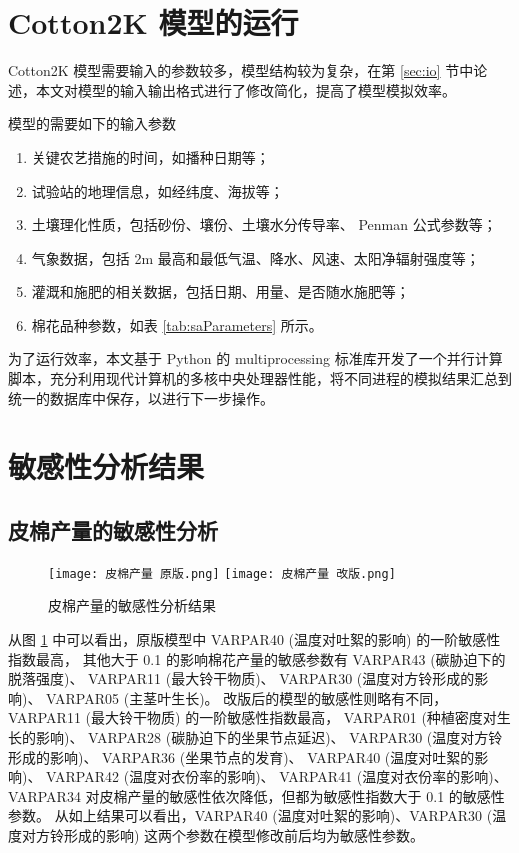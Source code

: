 \begin{spacing}{}
    \section{Cotton2K 模型的运行}
    Cotton2K 模型需要输入的参数较多，模型结构较为复杂，在第 \ref{sec:io} 节中论述，本文对模型的输入输出格式进行了修改简化，提高了模型模拟效率。

    模型的需要如下的输入参数
    \begin{enumerate}
        \item 关键农艺措施的时间，如播种日期等；
        \item 试验站的地理信息，如经纬度、海拔等；
        \item 土壤理化性质，包括砂份、壤份、土壤水分传导率、 Penman 公式参数等；
        \item 气象数据，包括 2m 最高和最低气温、降水、风速、太阳净辐射强度等；
        \item 灌溉和施肥的相关数据，包括日期、用量、是否随水施肥等；
        \item 棉花品种参数，如表 \ref{tab:saParameters} 所示。
    \end{enumerate}

    为了运行效率，本文基于 Python 的 multiprocessing 标准库开发了一个并行计算脚本，充分利用现代计算机的多核中央处理器性能，将不同进程的模拟结果汇总到统一的数据库中保存，以进行下一步操作。


    \section{敏感性分析结果}
    \subsection{皮棉产量的敏感性分析}
    \begin{figure}
        \centering
        \texttt{[image: 皮棉产量 原版.png]}
        \texttt{[image: 皮棉产量 改版.png]}
        \caption{皮棉产量的敏感性分析结果}\label{fig:saLintYield}
    \end{figure}

    从图 \ref{fig:saLintYield} 中可以看出，原版模型中 VARPAR40 (温度对吐絮的影响) 的一阶敏感性指数最高，%
    其他大于 0.1 的影响棉花产量的敏感参数有
    VARPAR43 (碳胁迫下的脱落强度)、%
    VARPAR11 (最大铃干物质)、%
    VARPAR30 (温度对方铃形成的影响)、%
    VARPAR05 (主茎叶生长)。%
    改版后的模型的敏感性则略有不同，%
    VARPAR11 (最大铃干物质) 的一阶敏感性指数最高，%
    VARPAR01 (种植密度对生长的影响)、%
    VARPAR28 (碳胁迫下的坐果节点延迟)、%
    VARPAR30 (温度对方铃形成的影响)、%
    VARPAR36 (坐果节点的发育)、%
    VARPAR40 (温度对吐絮的影响)、%
    VARPAR42 (温度对衣份率的影响)、%
    VARPAR41 (温度对衣份率的影响)、%
    VARPAR34 对皮棉产量的敏感性依次降低，但都为敏感性指数大于 0.1 的敏感性参数。%
    从如上结果可以看出，VARPAR40 (温度对吐絮的影响)、VARPAR30 (温度对方铃形成的影响) 这两个参数在模型修改前后均为敏感性参数。%


\end{spacing}
